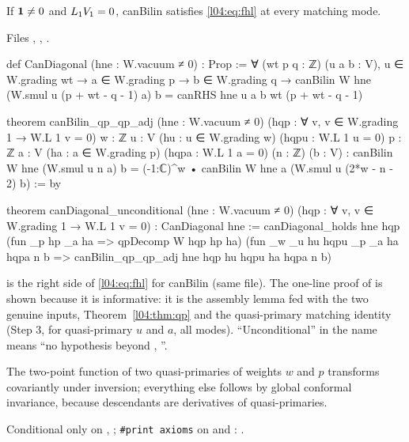 \begin{theorem}[The diagonal identity, unconditionally under $L_1\lfourV_1 = 0$]\label{l04:thm:diag}
If $\mathbf{1}\ne0$ and $L_1\lfourV_1 = 0$, canBilin satisfies \eqref{l04:eq:fhl} at every matching mode.
\end{theorem}
\noindent Files , , .
\begin{leancode}
def CanDiagonal (hne : W.vacuum ≠ 0) : Prop :=
  ∀ (wt p q : ℤ) (u a b : V), u ∈ W.grading wt → a ∈ W.grading p → b ∈ W.grading q →
    canBilin W hne (W.smul u (p + wt - q - 1) a) b = canRHS hne u a b wt (p + wt - q - 1)

theorem canBilin_qp_qp_adj (hne : W.vacuum ≠ 0) (hqp : ∀ v, v ∈ W.grading 1 → W.L 1 v = 0)
    {w : ℤ} {u : V} (hu : u ∈ W.grading w) (hqpu : W.L 1 u = 0)
    {p : ℤ} {a : V} (ha : a ∈ W.grading p) (hqpa : W.L 1 a = 0) (n : ℤ) (b : V) :
    canBilin W hne (W.smul u n a) b = (-1:ℂ)^w • canBilin W hne a (W.smul u (2*w - n - 2) b) := by

theorem canDiagonal_unconditional (hne : W.vacuum ≠ 0)
    (hqp : ∀ v, v ∈ W.grading 1 → W.L 1 v = 0) : CanDiagonal hne :=
  canDiagonal_holds hne hqp (fun {_p} hp {_a} ha => qpDecomp W hqp hp ha)
    (fun {_w} {_u} hu hqpu {_p} {_a} ha hqpa n b => canBilin_qp_qp_adj hne hqp hu hqpu ha hqpa n b)
\end{leancode}
\begin{dictionary}
 is the right side of \eqref{l04:eq:fhl} for canBilin (same file). The
one-line proof of \allowbreak{} is shown because it is informative: it is the
assembly lemma \allowbreak{} fed with the two genuine inputs, Theorem~\ref{l04:thm:qp} and the
quasi-primary matching identity \allowbreak{}\allowbreak{}\allowbreak{} (Step 3, for quasi-primary $u$ and $a$, all
modes). ``Unconditional'' in the name means ``no hypothesis beyond , ''.
\end{dictionary}
\begin{physics}
The two-point function of two quasi-primaries of weights $w$ and $p$ transforms covariantly under
inversion; everything else follows by global conformal invariance, because descendants are derivatives
of quasi-primaries.
\end{physics}
\begin{status}
Conditional only on , ; \texttt{\#print axioms} on \allowbreak{} and
\allowbreak{}\allowbreak{}\allowbreak{}: .
\end{status}


